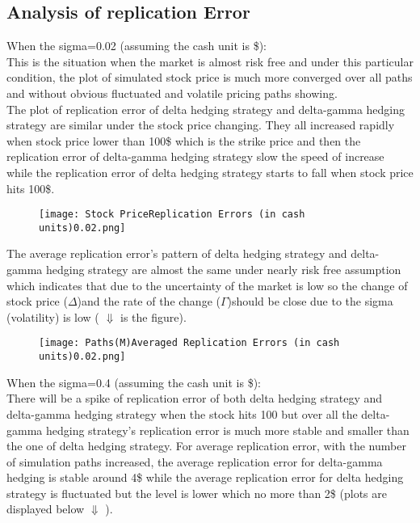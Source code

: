 \documentclass[14pt]{extarticle}
\begin{document}
\subsection{Analysis of replication Error }

When the sigma=0.02 (assuming the cash unit is \$): \\
This is the situation when the market is almost risk free and under this particular condition, the plot of simulated stock price is much more converged over all paths and without obvious fluctuated and volatile pricing paths showing.\\





The plot of replication error of delta hedging strategy and delta-gamma hedging strategy are similar under the stock price changing. They all increased rapidly when stock price lower than 100\$ which is the strike price and then the replication error of delta-gamma hedging strategy slow the speed of increase while the replication error of delta hedging strategy starts to fall when stock price hits 100\$.\\

\newpage
\begin{figure}[h] 
    \centering 
    \texttt{[image: Stock PriceReplication Errors (in cash units)0.02.png]}
 \end{figure}

The average replication error’s pattern of delta hedging strategy and delta-gamma hedging strategy are almost the same under nearly risk free assumption which indicates that due to the uncertainty of the market is low so the change of stock price ($\Delta$)and the rate of the change ($\Gamma$)should be close due to the sigma (volatility) is low ( $\Downarrow$ is the figure).\\

\begin{figure}[h] 
    \centering 
    \texttt{[image: Paths(M)Averaged Replication Errors (in cash units)0.02.png]}
 \end{figure}


When the sigma=0.4 (assuming the cash unit is \$): \\
There will be a spike of replication error of both delta hedging strategy and delta-gamma hedging strategy when the stock hits 100 but over all the delta-gamma hedging strategy’s replication error is much more stable and smaller than the one of delta hedging strategy.
For average replication error, with the number of simulation paths increased, the average replication error for delta-gamma hedging is stable around 4\$ while the average replication error for delta hedging strategy is fluctuated but the level is lower which no more than 2\$ (plots are displayed below $\Downarrow$ ).\\
\end{document}
